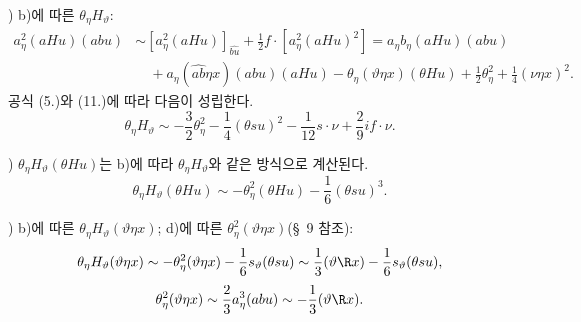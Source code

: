 
) b)에 따른 $\theta_\eta H_\vartheta$:
\[
\begin{aligned}
a_\eta^2(aHu)(abu)
&\sim [a_\eta^2(aHu)]_{\widehat{bu}}+\frac12 f\cdot[a_\eta^2(aHu)^2]
=a_\eta b_\eta(aHu)(abu)\\
&\quad+a_\eta(\widehat{ab}\eta x)(abu)(aHu)-\theta_\eta(\vartheta\eta x)(\theta Hu)+\frac12\theta_\eta^2+\frac14(\nu\eta x)^2.
\end{aligned}
\]
공식 (5.)와 (11.)에 따라 다음이 성립한다.
\[
\theta_\eta H_\vartheta\sim-\frac32\theta_\eta^2-\frac14(\theta su)^2-\frac1{12}s\cdot\nu+\frac29 i f\cdot\nu.
\]

) $\theta_\eta H_\vartheta(\theta Hu)$는 b)에 따라 $\theta_\eta H_\vartheta$와 같은 방식으로 계산된다.
\[
\theta_\eta H_\vartheta(\theta Hu)\sim-\theta_\eta^2(\theta Hu)-\frac16(\theta su)^3.
\]

) b)에 따른 $\theta_\eta H_\vartheta(\vartheta\eta x)$; d)에 따른 $\theta_\eta^2(\vartheta\eta x)$(\S\ 9 참조):
\[
\theta_\eta H_\vartheta(\vartheta\eta x)\sim-\theta_\eta^2(\vartheta\eta x)-\frac16s_\vartheta(\theta su)
\sim\frac13(\vartheta\R x)-\frac16s_\vartheta(\theta su),
\]
\[
\theta_\eta^2(\vartheta\eta x)\sim\frac23a_\eta^3(abu)\sim-\frac13(\vartheta\R x).
\]
